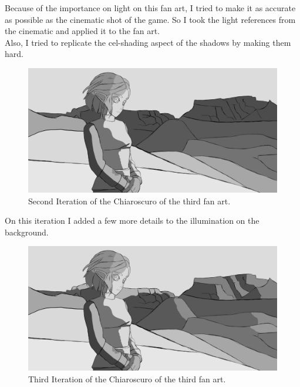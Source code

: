 \documentclass{cup-pan}
\begin{document}
        Because of the importance on light on this fan art, I tried to make it as accurate as possible as the cinematic shot of the game. So I took the light references from the cinematic and applied it to the fan art.\\

        Also, I tried to replicate the cel-shading aspect of the shadows by making them hard. 
        \begin{figure}[H]
            \includegraphics[width=\textwidth]{Fanart3/2_Claroscuro/II_Iteracion.png}
            \caption{Second Iteration of the Chiaroscuro of the third fan art.}
        \end{figure}

        On this iteration I added a few more details to the illumination on the background.
        \begin{figure}[H]
            \includegraphics[width=\textwidth]{Fanart3/2_Claroscuro/III_Iteracion.png}
            \caption{Third Iteration of the Chiaroscuro of the third fan art.}
        \end{figure}
\end{document}
